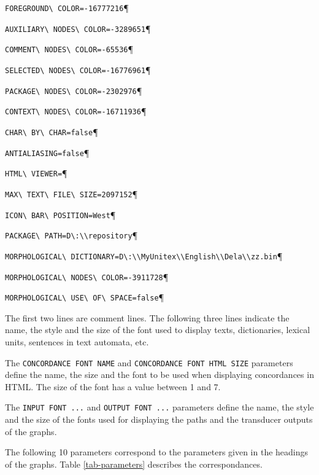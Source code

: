 \verb$FOREGROUND\ COLOR=-16777216$\P

\verb$AUXILIARY\ NODES\ COLOR=-3289651$\P

\verb$COMMENT\ NODES\ COLOR=-65536$\P

\verb$SELECTED\ NODES\ COLOR=-16776961$\P

\verb$PACKAGE\ NODES\ COLOR=-2302976$\P

\verb$CONTEXT\ NODES\ COLOR=-16711936$\P

\verb$CHAR\ BY\ CHAR=false$\P

\verb$ANTIALIASING=false$\P

\verb$HTML\ VIEWER=$\P

\verb$MAX\ TEXT\ FILE\ SIZE=2097152$\P

\verb$ICON\ BAR\ POSITION=West$\P

\verb$PACKAGE\ PATH=D\:\\repository$\P

\verb$MORPHOLOGICAL\ DICTIONARY=D\:\\MyUnitex\\English\\Dela\\zz.bin$\P

\verb$MORPHOLOGICAL\ NODES\ COLOR=-3911728$\P

\verb$MORPHOLOGICAL\ USE\ OF\ SPACE=false$\P


\bigskip
\noindent The first two lines are comment lines. The following three lines indicate the
name, the style and the size of the font used to display texts, dictionaries,
lexical units, sentences in text automata, etc.


\bigskip
\noindent The \verb$CONCORDANCE FONT NAME$ and \verb$CONCORDANCE FONT HTML SIZE$ parameters
define the name, the size and the font to be used when displaying concordances in
HTML. The size of the font has a value between 1 and 7.


\bigskip
\noindent The \verb$INPUT FONT ...$ and \verb$OUTPUT FONT ...$ parameters define the name,
the style and the size of the fonts used for displaying the paths and the
transducer outputs of the graphs.


\bigskip
\noindent The following 10 parameters correspond to the parameters given in the headings of
the graphs. Table \ref{tab-parameters} describes the
correspondances.

